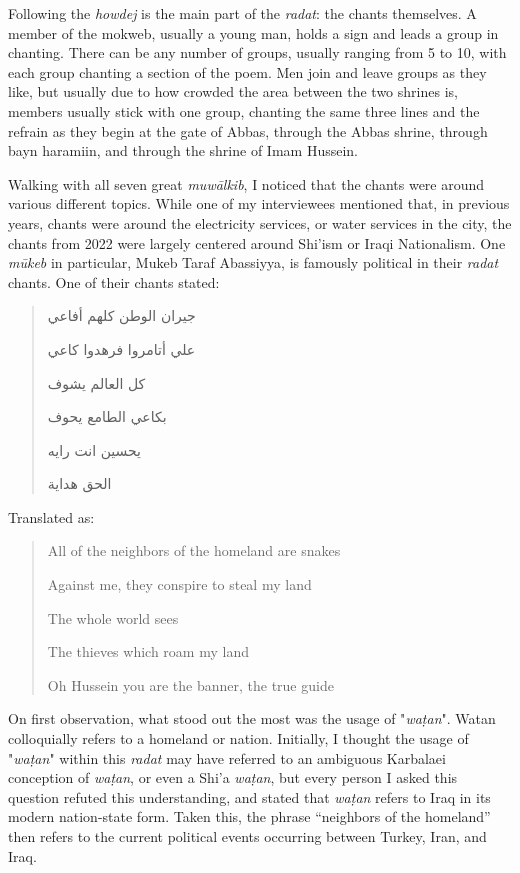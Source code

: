 

Following the \emph{howdej} is the main part of the \emph{radat}: the chants themselves. A member of the mokweb, usually a young man, holds a sign and leads a group in chanting. There can be any number of groups, usually ranging from 5 to 10, with each group chanting a section of the poem. Men join and leave groups as they like, but usually due to how crowded the area between the two shrines is, members usually stick with one group, chanting the same three lines and the refrain as they begin at the gate of Abbas, through the Abbas shrine, through bayn haramiin, and through the shrine of Imam Hussein. 

Walking with all seven great \emph{muwālkib}, I noticed that the chants were around various different topics. While one of my interviewees mentioned that, in previous years, chants were around the electricity services, or water services in the city, the chants from 2022 were largely centered around Shi'ism or Iraqi Nationalism. One \emph{mūkeb} in particular, Mukeb Taraf Abassiyya, is famously political in their \emph{radat} chants. One of their chants stated: 

\begin{quote}
\begin{Arabic}
جيران الوطن كلهم أفاعي

علي أتامروا فرهدوا كاعي

كل العالم يشوف

بكاعي الطامع يحوف

يحسين انت رايه

الحق هداية
\end{Arabic}
\end{quote}

Translated as: 
\begin{quote}
All of the neighbors of the homeland are snakes

Against me, they conspire to steal my land

The whole world sees

The thieves which roam my land

Oh Hussein you are the banner, the true guide
\end{quote}

On first observation, what stood out the most was the usage of "\emph{waṭan}". Watan colloquially refers to a homeland or nation. Initially, I thought the usage of "\emph{waṭan}" within this \emph{radat} may have referred to an ambiguous Karbalaei conception of \emph{waṭan}, or even a Shi'a \emph{waṭan}, but every person I asked this question refuted this understanding, and stated that \emph{waṭan} refers to Iraq in its modern nation-state form. Taken this, the phrase “neighbors of the homeland” then refers to the current political events occurring between Turkey, Iran, and Iraq. 

